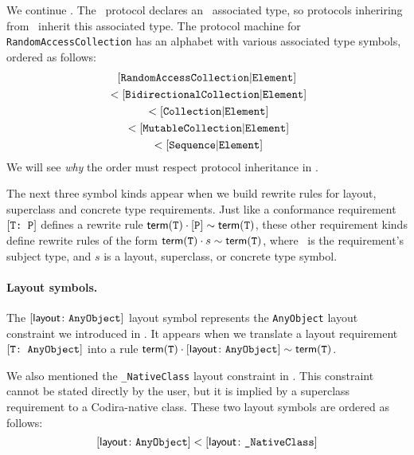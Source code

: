 \documentclass[../generics]{subfiles}
\begin{document}
\begin{example}
We continue . The \tSequence\ protocol declares an \nElement\ associated type, so protocols inheriring from \tSequence\ inherit this associated type. The protocol machine for \texttt{RandomAccessCollection} has an alphabet with various associated type symbols, ordered as follows:
\begin{gather*}
[\texttt{RandomAccessCollection}|\texttt{Element}]\\
{} < [\texttt{BidirectionalCollection}|\texttt{Element}]\\
{} < [\texttt{Collection}|\texttt{Element}]\\
{} < [\texttt{MutableCollection}|\texttt{Element}]\\
{} < [\texttt{Sequence}|\texttt{Element}]
\end{gather*}
We will see \emph{why} the order must respect protocol inheritance in .
\end{example}

\medskip

The next three symbol kinds appear when we build rewrite rules for layout, superclass and concrete type requirements. Just like a conformance requirement $[\texttt{T:~P}]$ defines a rewrite rule $\mathsf{term}(\texttt{T})\cdot[\texttt{P}]\sim\mathsf{term}(\texttt{T})$, these other requirement kinds define rewrite rules of the form $\mathsf{term}(\texttt{T})\cdot s\sim\mathsf{term}(\texttt{T})$, where \tT\ is the requirement's subject type, and $s$ is a layout, superclass, or concrete type symbol.

\paragraph{Layout symbols.} The $[\mathsf{layout}\colon\texttt{AnyObject}]$ layout symbol represents the \texttt{AnyObject} layout constraint we introduced in . It appears when we translate a layout requirement $[\texttt{T:~AnyObject}]$ into a rule $\mathsf{term}(\texttt{T})\cdot[\mathsf{layout}\colon\texttt{AnyObject}] \sim \mathsf{term}(\texttt{T})$.

We also mentioned the \verb|_NativeClass| layout constraint in . This constraint cannot be stated directly by the user, but it is implied by a superclass requirement to a Codira-native class. These two layout symbols are ordered as follows:
\[\layoutsym{AnyObject} < \layoutsym{\char`_NativeClass}\]
\end{document}
